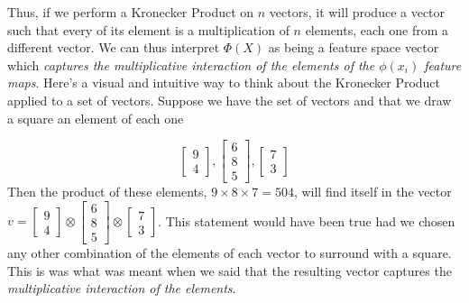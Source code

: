 \documentclass{article}
\theoremstyle{definition}
\theoremstyle{definition}
\begin{document}
Thus, if we perform a Kronecker Product on $n$ vectors, it will produce a vector such that every of its element is a multiplication of $n$ elements, each one from a different vector. We can thus interpret $\Phi(X)$ as being a feature space vector which \emph{captures the multiplicative interaction of the elements of the $\phi(x_i)$ feature maps}. Here's a visual and intuitive way to think about the Kronecker Product applied to a set of vectors. Suppose we have the set of vectors and that we draw a square an element of each one

\[
    \begin{bmatrix}
        \boxed{9} \\ 4
    \end{bmatrix},
    \begin{bmatrix}
        6 \\ \boxed{8} \\ 5
    \end{bmatrix},
    \begin{bmatrix}
        \boxed{7} \\ 3
    \end{bmatrix}
\]
Then the product of these elements,  $9\times8\times7=504$, will find itself in the vector $v=
    \begin{bmatrix}
        9 \\ 4
    \end{bmatrix}
    \otimes
    \begin{bmatrix}
        6 \\ 8 \\ 5
    \end{bmatrix}
    \otimes
    \begin{bmatrix}
        7 \\ 3
    \end{bmatrix}
$. This statement would have been true had we chosen any other combination of the elements of each vector to surround with a square. This is was what was meant when we said that the resulting vector captures the \emph{multiplicative interaction of the elements}.
\end{document}

